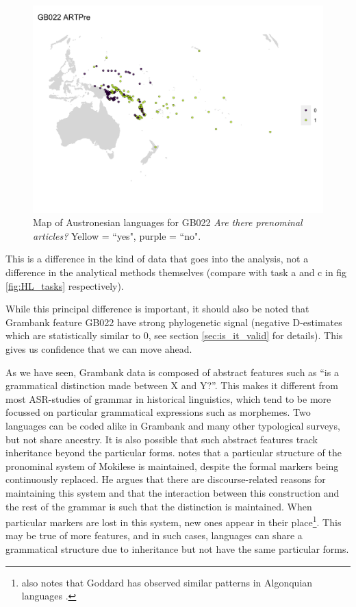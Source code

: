 \documentclass[12pt,letterpaper]{article}
\begin{document}
\begin{figure}
\centering
\includegraphics[width=16cm]{illustrations/plots_from_R/coverage_plots/maps/map_GB022.png}
\caption{{Map of Austronesian languages for GB022 \emph{Are there prenominal articles?} Yellow = ``yes", purple = ``no".}}
\label{fig:gb022_map}
\end{figure}

This is a difference in the kind of data that goes into the analysis, not a difference in the analytical methods themselves (compare with task a and c in fig \ref{fig:HL_tasks} respectively). 

While this principal difference is important, it should also be noted that Grambank feature GB022 have strong phylogenetic signal (negative D-estimates which are statistically similar to 0, see section \ref{sec:is_it_valid} for details). This gives us confidence that we can move ahead.

As we have seen, Grambank data is composed of abstract features such as ``is a grammatical distinction made between X and Y?''. This makes it different from most ASR-studies of grammar in historical linguistics, which tend to be more focussed on particular grammatical expressions such as morphemes. Two languages can be coded alike in Grambank and many other typological surveys, but not share ancestry. It is also possible that such abstract features track inheritance beyond the particular forms. \citet[503]{ross2004morphosyntactic} notes that a particular structure of the pronominal system of Mokilese is maintained, despite the formal markers being continuously replaced. He argues that there are discourse-related reasons for maintaining this system and that the interaction between this construction and the rest of the grammar is such that the distinction is maintained. When particular markers are lost in this system, new ones appear in their place\footnote{ \citet{ross2004morphosyntactic} also notes that Goddard has observed similar patterns in Algonquian languages \citep{goddard1993algonquian}.}. This may be true of more features, and in such cases, languages can share a grammatical structure due to inheritance but not have the same particular forms.%
\end{document}
